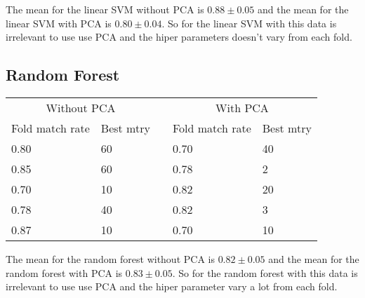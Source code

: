 \documentclass{article}
\begin{document}
The mean for the linear SVM without PCA is $0.88 \pm 0.05$ and the mean for the linear SVM with PCA is $0.80 \pm 0.04$. So for the linear SVM with this data is irrelevant to use use PCA and the hiper parameters doesn't vary from each fold.

\subsection{Random Forest}

\begin{table}[h]
    \begin{tabular}{|l|l|l|l|l|}
    \cline{1-2} \cline{4-5}
    \multicolumn{2}{|c|}{Without PCA} &  & \multicolumn{2}{|c|}{With PCA} \\ \cline{1-2} \cline{4-5}
    Fold match rate & Best mtry &  & Fold match rate & Best mtry  \\ \cline{1-2} \cline{4-5} 
    0.80 & 60 &  & 0.70 & 40  \\ \cline{1-2} \cline{4-5} 
    0.85 & 60 &  & 0.78 & 2   \\ \cline{1-2} \cline{4-5} 
    0.70 & 10 &  & 0.82 & 20  \\ \cline{1-2} \cline{4-5} 
    0.78 & 40 &  & 0.82 & 3   \\ \cline{1-2} \cline{4-5} 
    0.87 & 10 &  & 0.70 & 10  \\ \cline{1-2} \cline{4-5}
    \end{tabular}
\end{table}

The mean for the random forest without PCA is $0.82 \pm 0.05$ and the mean for the random forest with PCA is $0.83 \pm 0.05$. So for the random forest with this data is irrelevant to use use PCA and the hiper parameter vary a lot from each fold.
\end{document}
